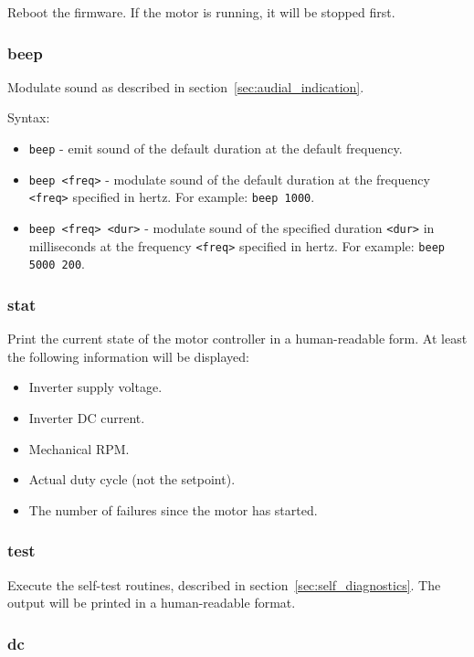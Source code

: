 \documentclass{zubaxdoc}
\begin{document}
Reboot the firmware.
If the motor is running, it will be stopped first.

\subsubsection{beep}

Modulate sound as described in section~\ref{sec:audial_indication}.

Syntax:
\begin{itemize}
	\item \verb|beep| - emit sound of the default duration at the default frequency.
	\item \verb|beep <freq>| - modulate sound of the default duration at the frequency \verb|<freq>|
	specified in hertz. For example: \verb|beep 1000|.
	\item \verb|beep <freq> <dur>| - modulate sound of the specified duration \verb|<dur>| in milliseconds
	at the frequency \verb|<freq>| specified in hertz. For example: \verb|beep 5000 200|.
\end{itemize}

\subsubsection{stat}

Print the current state of the motor controller in a human-readable form.
At least the following information will be displayed:
\begin{itemize}
	\item Inverter supply voltage.
	\item Inverter DC current.
	\item Mechanical RPM.
	\item Actual duty cycle (not the setpoint).
	\item The number of failures since the motor has started.
\end{itemize}

\subsubsection{test}

Execute the self-test routines, described in section~\ref{sec:self_diagnostics}.
The output will be printed in a human-readable format.

\subsubsection{dc}
\end{document}
